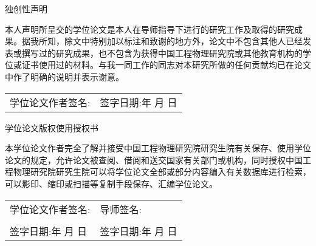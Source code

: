 \cleardoublepage
\vspace{20pt}
\begin{center}
  独创性声明
\end{center}
\vspace{40pt}
\par 本人声明所呈交的学位论文是本人在导师指导下进行的研究工作及取得的研究成果。据我所知，除文中特别加以标注和致谢的地方外，论文中不包含其他人已经发表或撰写过的研究成果，也不包含为获得中国工程物理研究院或其他教育机构的学位或证书使用过的材料。与我一同工作的同志对本研究所做的任何贡献均已在论文中作了明确的说明并表示谢意。

\vspace{30pt}

\noindent \begin{tabular}{@{}p{}p{}}
  学位论文作者签名: & 签字日期:\qquad \quad 年 \quad 月 \quad 日
\end{tabular}

\vspace{80pt}
\begin{center}
  学位论文版权使用授权书
\end{center}

\vspace{30pt}
\par 本学位论文作者完全了解并接受中国工程物理研究院研究生院有关保存、使用学位论文的规定，允许论文被查阅、借阅和送交国家有关部门或机构，同时授权中国工程物理研究院研究生院可以将学位论文全部或部分内容编入有关数据库进行检索，可以影印、缩印或扫描等复制手段保存、汇编学位论文。

\vspace{40pt}
\begin{flushleft}
\begin{tabular}{@{}p{}p{}}
学位论文作者签名:                          & 导师签名:                                  \\
  \\
签字日期:\qquad \quad 年 \quad 月 \quad 日 & 签字日期:\qquad \quad 年 \quad 月 \quad 日
\end{tabular}
\end{flushleft}


\cleardoublepage

\pagestyle{fancy}